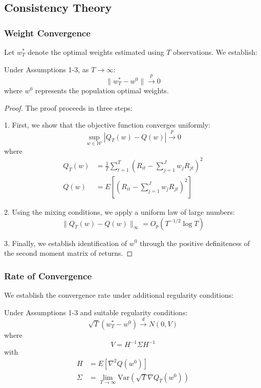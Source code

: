 \subsection{Consistency Theory}

\subsubsection{Weight Convergence}

Let $w_T^*$ denote the optimal weights estimated using $T$ observations. We establish:

\begin{theorem}
Under Assumptions 1-3, as $T \to \infty$:
\begin{equation}
    \|w_T^* - w^0\| \xrightarrow{p} 0
\end{equation}
where $w^0$ represents the population optimal weights.
\end{theorem}

\begin{proof}
The proof proceeds in three steps:

1. First, we show that the objective function converges uniformly:
\begin{equation}
    \sup_{w \in \mathcal{W}} |Q_T(w) - Q(w)| \xrightarrow{p} 0
\end{equation}
where
\begin{align}
    Q_T(w) &= \frac{1}{T}\sum_{t=1}^T (R_{it} - \sum_{j=1}^J w_jR_{jt})^2 \\
    Q(w) &= E[(R_{it} - \sum_{j=1}^J w_jR_{jt})^2]
\end{align}

2. Using the mixing conditions, we apply a uniform law of large numbers:
\begin{equation}
    \|Q_T(w) - Q(w)\|_{\infty} = O_p(T^{-1/2}\log T)
\end{equation}

3. Finally, we establish identification of $w^0$ through the positive definiteness of the second moment matrix of returns.
\end{proof}

\subsubsection{Rate of Convergence}

We establish the convergence rate under additional regularity conditions:

\begin{theorem}
Under Assumptions 1-3 and suitable regularity conditions:
\begin{equation}
    \sqrt{T}(w_T^* - w^0) \xrightarrow{d} N(0, V)
\end{equation}
where
\begin{equation}
    V = H^{-1}\Sigma H^{-1}
\end{equation}
with
\begin{align}
    H &= E[\nabla^2 Q(w^0)] \\
    \Sigma &= \lim_{T \to \infty} \text{Var}(\sqrt{T}\nabla Q_T(w^0))
\end{align}
\end{theorem}

